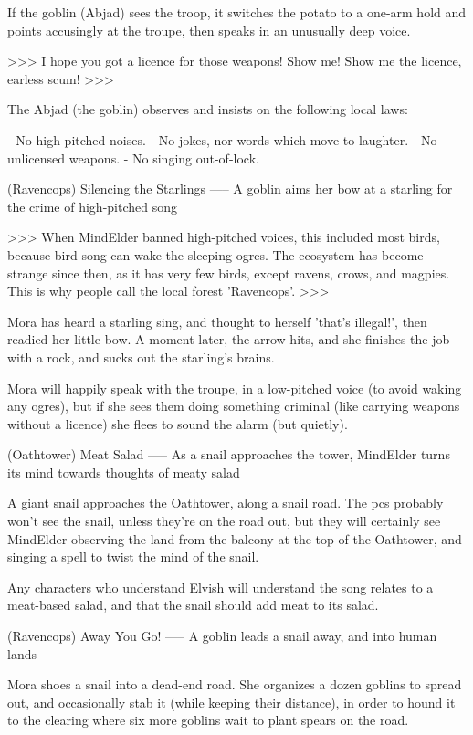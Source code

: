If the goblin (Abjad) sees the troop, it switches the potato to a one-arm hold and points accusingly at the troupe, then speaks in an unusually deep voice.

>>>
I hope you got a licence for those weapons!
Show me!
Show me the licence, earless scum!
>>>

The Abjad (the goblin) observes and insists on the following local laws:

- No high-pitched noises.
- No jokes, nor words which move to laughter.
- No unlicensed weapons.
- No singing out-of-lock.


(Ravencops) Silencing the Starlings
-----
{A goblin aims her bow at a starling for the crime of high-pitched song}

>>>
When \gls{MindElder} banned high-pitched voices, this included most birds, because bird-song can wake the sleeping ogres.
The ecosystem has become strange since then, as it has very few birds, except ravens, crows, and magpies.
This is why people call the local forest 'Ravencops'.
>>>

Mora has heard a starling sing, and thought to herself 'that's illegal!', then readied her little bow.
A moment later, the arrow hits, and she finishes the job with a rock, and sucks out the starling's brains.

Mora will happily speak with the troupe, in a low-pitched voice (to avoid waking any ogres), but if she sees them doing something criminal (like carrying weapons without a licence) she flees to sound the alarm (but quietly).

(Oathtower) Meat Salad
-----
{As a snail approaches the tower, \gls{MindElder} turns its mind towards thoughts of meaty salad}

A giant snail approaches the Oathtower, along a snail road.
The \glspl{pc} probably won't see the snail, unless they're on the road out, but they will certainly see \gls{MindElder} observing the land from the balcony at the top of the Oathtower, and singing a spell to twist the mind of the snail.

Any characters who understand Elvish
will understand the song relates to a meat-based salad, and that the snail should add meat to its salad.

(Ravencops) Away You Go!
-----
{A goblin leads a snail away, and into human lands}

Mora shoes a snail into a dead-end road.
She organizes a dozen goblins to spread out, and occasionally stab it (while keeping their distance), in order to hound it to the clearing where  six more goblins wait to plant spears on the road.


